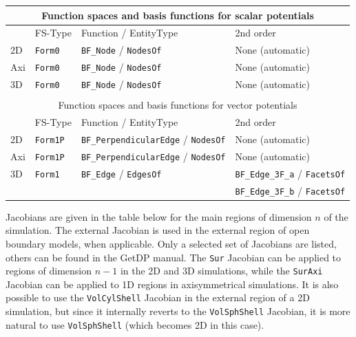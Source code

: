 \documentclass[letterpaper]{article}
\newcommand{\keyw}[1]{\texttt{\small #1}}
\begin{document}
 

\begin{table}[h!]
\centering
\begin{tabular}{llll}
\multicolumn{4}{c}{Function spaces and basis functions for scalar potentials} \\
\hline
 & FS-Type & Function / EntityType & 2nd order \\\hline
2D & \keyw{Form0} & \keyw{BF\_Node} / \keyw{NodesOf} & None (automatic)  \\
Axi & \keyw{Form0} & \keyw{BF\_Node} / \keyw{NodesOf} & None (automatic) \\
3D & \keyw{Form0} & \keyw{BF\_Node} / \keyw{NodesOf} & None (automatic) \\
 \hline
 &&&\\

 \multicolumn{4}{c}{Function spaces and basis functions for vector potentials} \\ 
 \hline
 & FS-Type & Function / EntityType &  2nd order \\\hline
2D & \keyw{Form1P} & \keyw{BF\_PerpendicularEdge} / \keyw{NodesOf} & None (automatic)  \\
Axi & \keyw{Form1P} & \keyw{BF\_PerpendicularEdge} / \keyw{NodesOf} & None (automatic) \\
3D & \keyw{Form1} & \keyw{BF\_Edge} / \keyw{EdgesOf} & \keyw{BF\_Edge\_3F\_a} / \keyw{FacetsOf} \\
 & & & \keyw{BF\_Edge\_3F\_b} / \keyw{FacetsOf} \\ 
\hline
\end{tabular}
\end{table}


Jacobians are given in the table below for the main regions of dimension $n$ of the simulation.  %
The external Jacobian is used in the external region of open boundary models, when applicable. Only a selected set of Jacobians are listed, others can be found in the GetDP manual. 
The \keyw{Sur} Jacobian can be applied to regions of dimension $n-1$ in the 2D and 3D simulations, while the \keyw{SurAxi} Jacobian can be applied to 1D regions in axisymmetrical simulations. It is also possible to use the \keyw{VolCylShell} Jacobian in the external region of a 2D simulation, but since it internally reverts to the \keyw{VolSphShell} Jacobian, it is more natural to use \keyw{VolSphShell} (which becomes 2D in this case).
\end{document}
